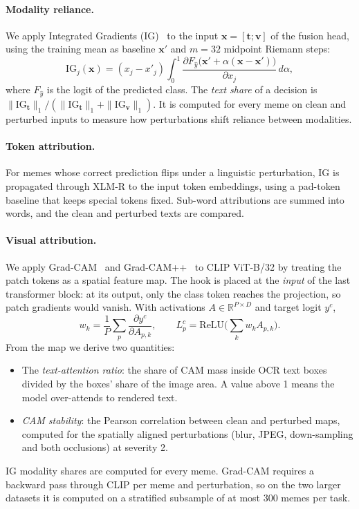 \paragraph{Modality reliance.}
We apply Integrated Gradients (IG)~\cite{sundararajan2017ig} to the input $\mathbf{x}=[\mathbf{t};\mathbf{v}]$ of the
fusion head, using the training mean as baseline $\mathbf{x}'$ and $m=32$ midpoint Riemann steps:
\begin{equation}
\mathrm{IG}_j(\mathbf{x})=(x_j-x'_j)\int_{0}^{1}
\frac{\partial F_{\hat{y}}\big(\mathbf{x}'+\alpha(\mathbf{x}-\mathbf{x}')\big)}{\partial x_j}\,d\alpha ,
\end{equation}
where $F_{\hat{y}}$ is the logit of the predicted class. The \emph{text share} of a decision is
$\|\mathrm{IG}_{\mathbf{t}}\|_1/(\|\mathrm{IG}_{\mathbf{t}}\|_1+\|\mathrm{IG}_{\mathbf{v}}\|_1)$. It is computed
for every meme on clean and perturbed inputs to measure how perturbations shift reliance between modalities.

\paragraph{Token attribution.}
For memes whose correct prediction flips under a linguistic perturbation, IG is propagated through XLM-R to the input
token embeddings, using a pad-token baseline that keeps special tokens fixed. Sub-word attributions are summed into
words, and the clean and perturbed texts are compared.

\paragraph{Visual attribution.}
We apply Grad-CAM~\cite{selvaraju2017gradcam} and Grad-CAM++~\cite{chattopadhay2018gradcampp} to CLIP ViT-B/32 by
treating the patch tokens as a spatial feature map. The hook is placed at the \emph{input} of the last transformer
block: at its output, only the class token reaches the projection, so patch gradients would vanish. With
activations $A\in\mathbb{R}^{P\times D}$ and target logit $y^{c}$,
\begin{equation}
w_k=\frac{1}{P}\sum_{p}\frac{\partial y^{c}}{\partial A_{p,k}},\qquad
L^{c}_{p}=\mathrm{ReLU}\Big(\sum_k w_k A_{p,k}\Big).
\end{equation}
From the map we derive two quantities:
\begin{itemize}
  \item The \emph{text-attention ratio}: the share of CAM mass inside OCR text boxes divided by the boxes' share of
  the image area. A value above 1 means the model over-attends to rendered text.
  \item \emph{CAM stability}: the Pearson correlation between clean and perturbed maps, computed for the spatially
  aligned perturbations (blur, JPEG, down-sampling and both occlusions) at severity 2.
\end{itemize}
IG modality shares are computed for every meme. Grad-CAM requires a backward pass through CLIP per meme and
perturbation, so on the two larger datasets it is computed on a stratified subsample of at most 300 memes per task.

